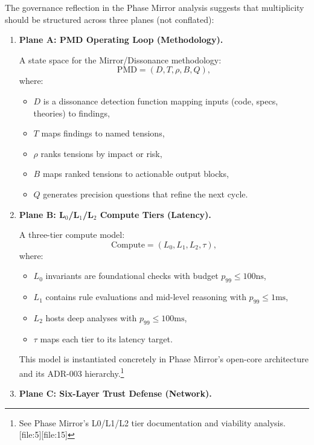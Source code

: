 \documentclass[11pt]{article}
\begin{document}
The governance reflection in the Phase Mirror analysis suggests that multiplicity should be structured across three planes (not conflated):

\begin{enumerate}[leftmargin=*]
  \item \textbf{Plane A: PMD Operating Loop (Methodology).}

  A state space for the Mirror/Dissonance methodology:
  \[
  \mathrm{PMD} = (D, T, \rho, B, Q),
  \]
  where:
  \begin{itemize}
    \item \(D\) is a dissonance detection function mapping inputs (code, specs, theories) to findings,
    \item \(T\) maps findings to named tensions,
    \item \(\rho\) ranks tensions by impact or risk,
    \item \(B\) maps ranked tensions to actionable output blocks,
    \item \(Q\) generates precision questions that refine the next cycle.
  \end{itemize}

  \item \textbf{Plane B: L\(_0\)/L\(_1\)/L\(_2\) Compute Tiers (Latency).}

  A three-tier compute model:
  \[
  \mathrm{Compute} = (L_0, L_1, L_2, \tau),
  \]
  where:
  \begin{itemize}
    \item \(L_0\) invariants are foundational checks with budget \(p_{99} \le 100\text{ns}\),
    \item \(L_1\) contains rule evaluations and mid-level reasoning with \(p_{99} \le 1\text{ms}\),
    \item \(L_2\) hosts deep analyses with \(p_{99} \le 100\text{ms}\),
    \item \(\tau\) maps each tier to its latency target.
  \end{itemize}
  This model is instantiated concretely in Phase Mirror's open-core architecture and its ADR-003 hierarchy.\footnote{See Phase Mirror's L0/L1/L2 tier documentation and viability analysis. [file:5][file:15]}

  \item \textbf{Plane C: Six-Layer Trust Defense (Network).}


\end{enumerate}
\end{document}
